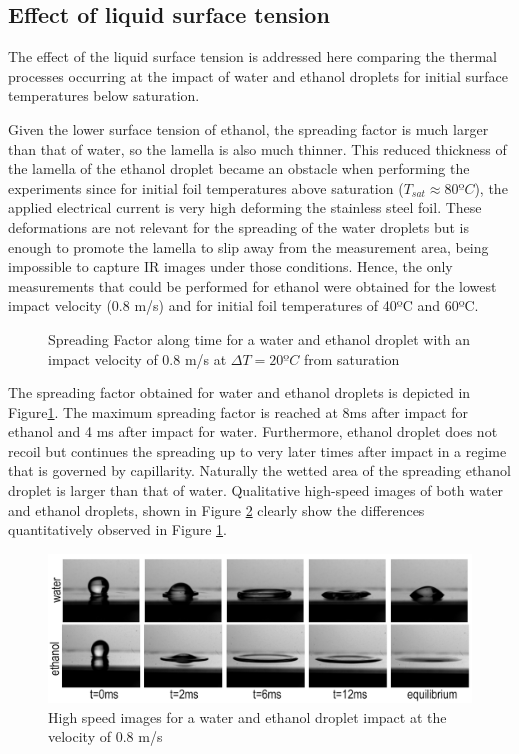 \subsection{Effect of liquid surface tension}

\par The effect of the liquid surface tension is addressed here comparing the thermal processes occurring at the impact of water and ethanol droplets for initial surface temperatures below saturation.\\
\par Given the lower surface tension of ethanol, the spreading factor is much larger than that of water, so the lamella is also much thinner. This reduced thickness of the lamella of the ethanol droplet became an obstacle when performing the experiments since for initial foil temperatures above saturation ($T_{sat} \approx 80ºC$), the applied electrical current is very high deforming the stainless steel foil. These deformations are not relevant for the spreading of the water droplets but is enough to promote the lamella to slip away from the measurement area, being impossible to capture IR images under those conditions. Hence, the only measurements that could be performed for ethanol were obtained for the lowest impact velocity (0.8 m/s) and for initial foil temperatures of 40ºC and 60ºC.\\

\begin{figure}[h!]
\centering

\caption{Spreading Factor along time for a water and ethanol droplet with an impact velocity of 0.8 m/s at $\Delta T=20ºC$ from saturation }
\label{fig:ethdiameter}
\end{figure}
\par The spreading factor obtained for water and ethanol droplets is depicted in Figure\ref{fig:ethdiameter}. The maximum spreading factor is reached at 8ms after impact for ethanol and 4 ms after impact for water. Furthermore, ethanol droplet does not recoil but continues the spreading up to very later times after impact in a regime that is governed by capillarity. Naturally the wetted area of the spreading ethanol droplet is larger than that of water. Qualitative high-speed images of both water and ethanol droplets, shown in Figure \ref{fig:ethhs} clearly show the differences quantitatively observed in Figure \ref{fig:ethdiameter}.\\

\begin{figure}[h!]
\centering
\includegraphics[width=1\linewidth]{Figures/5.Chapter/hsetanol.png}
\caption{High speed images for a water and ethanol droplet impact at the velocity of 0.8 m/s}
\label{fig:ethhs}
\end{figure}

